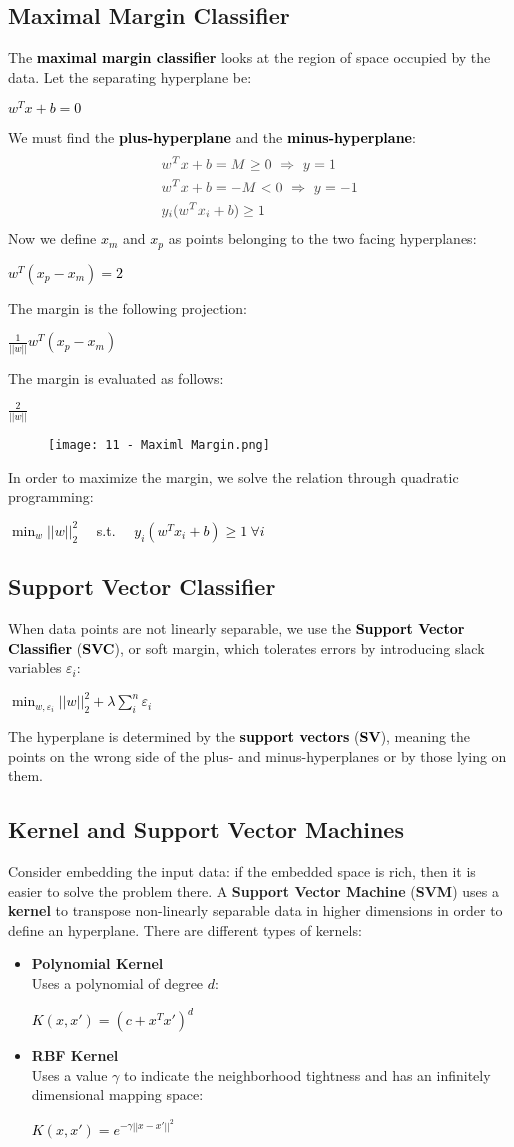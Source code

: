 \documentclass{article}
\newcommand{\bb}[1]{\textcolor{black}{\textbf{#1}}}
\newcommand{\rr}[1]{\textcolor{black}{#1}}
\newcommand{\cc}[1]{\begin{center}\textcolor{black}{#1}\end{center}}
\newcommand{\concept}[1]{\textbf{#1}\vspace{0.2cm}\\}
\begin{document}
\subsection{Maximal Margin Classifier}
The \bb{maximal margin classifier} looks at the region of space occupied by the data. Let the separating hyperplane be: 
\cc{$w^Tx+b=0$}
We must find the \bb{plus-hyperplane} and the \bb{minus-hyperplane}:
\begin{align*}
    &\textcolor{darkgray}{w^Tx + b = M \geq 0 \ \Rightarrow \ y = 1} \\
    &\textcolor{darkgray}{w^Tx + b = - M < 0 \ \Rightarrow \ y = -1} \\
    &\textcolor{darkgray}{y_i(w^Tx_i + b) \geq 1}
\end{align*}
Now we define \rr{$x_m$} and \rr{$x_p$} as points belonging to the two facing hyperplanes:
\cc{$w^T(x_p-x_m) = 2$}
The margin is the following projection:
\cc{$\displaystyle\frac{1}{||w||}w^T(x_p-x_m)$}
The margin is evaluated as follows:
\cc{$\displaystyle\frac{2}{||w||}$}
\begin{figure}[H]
    \centering
    \texttt{[image: 11 - Maximl Margin.png]}
\end{figure}
In order to maximize the margin, we solve the relation through quadratic programming:
\cc{$\min_w||w||^2_2$ \ \ s.t. \ \ $y_i(w^Tx_i+b) \geq 1 \ \forall i$}

\subsection{Support Vector Classifier}
When data points are not linearly separable, we use the \bb{Support Vector Classifier} (\bb{SVC}), or soft margin, which tolerates errors by introducing slack variables \rr{$\varepsilon_i$}:
\cc{$\displaystyle\min_{w,\varepsilon_i}||w||_2^2 + \lambda \displaystyle\sum^n_i \varepsilon_i$}
The hyperplane is determined by the \bb{support vectors} (\bb{SV}), meaning the points on the wrong side of the plus- and minus-hyperplanes or by those lying on them.

\subsection{Kernel and Support Vector Machines}
Consider embedding the input data: if the embedded space is rich, then it is easier to solve the problem there. A \textbf{Support Vector Machine} (\textbf{SVM}) uses a \textbf{kernel} to transpose non-linearly separable data in higher dimensions in order to define an hyperplane. There are different types of kernels:
\begin{itemize}
    \item \concept{Polynomial Kernel}
        Uses a polynomial of degree \rr{$d$}:
            \cc{$K(x,x')=(c+x^Tx')^d$}
    \item \concept{RBF Kernel}
        Uses a value $\gamma$ to indicate the neighborhood tightness and has an infinitely dimensional mapping space:
            \cc{$K(x,x')=e^{-\gamma||x-x'||^2}$}
\end{itemize}
\end{document}
